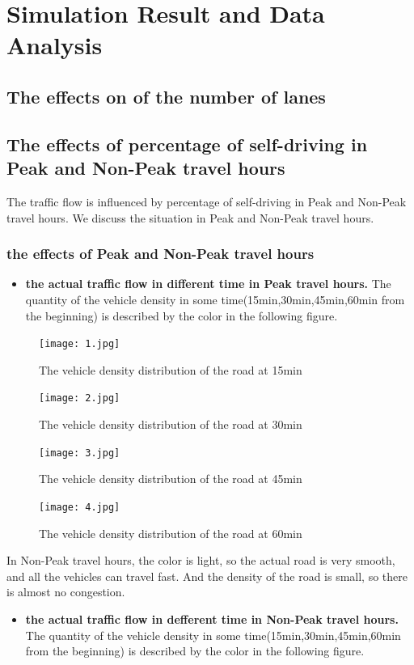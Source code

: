 \documentclass{mcmthesis}
\begin{document}
\section{Simulation Result and Data Analysis}
\subsection{The effects on of the number of lanes}
\label{lanes}
\subsection{The effects of percentage of self-driving in Peak and Non-Peak travel hours}
The traffic flow is influenced by percentage of self-driving in Peak and Non-Peak travel hours. We discuss the situation in Peak and Non-Peak travel hours. 
\subsubsection{the effects of Peak and Non-Peak travel hours}
\begin{itemize}
\item{\textbf{the actual traffic flow in different time in Peak travel hours.} The quantity of the vehicle density in some time(15min,30min,45min,60min from the beginning) is described by the color in the following figure. }
\end{itemize}
\begin{figure}[H]
	\centerline{\texttt{[image: 1.jpg]}}
	\caption{The vehicle density distribution of the road at 15min}	
\end{figure}
\begin{figure}[H]
	\centerline{\texttt{[image: 2.jpg]}}
	\caption{The vehicle density distribution of the road at 30min}	
\end{figure}
\begin{figure}[H]
	\centerline{\texttt{[image: 3.jpg]}}
	\caption{The vehicle density distribution of the road at 45min}	
\end{figure}
\begin{figure}[H]
	\centerline{\texttt{[image: 4.jpg]}}
	\caption{The vehicle density distribution of the road at 60min}	
\end{figure}
\indent\indent In Non-Peak travel hours, the color is light, so the actual road is very smooth, and all the vehicles can travel fast. And the density of the road is small, so there is almost no congestion.
\begin{itemize}
\item{\textbf{the actual traffic flow in defferent time in Non-Peak travel hours.}
 The quantity of the vehicle density in some time(15min,30min,45min,60min from the beginning) is described by the color in the following figure. }
\end{itemize}
\end{document}
